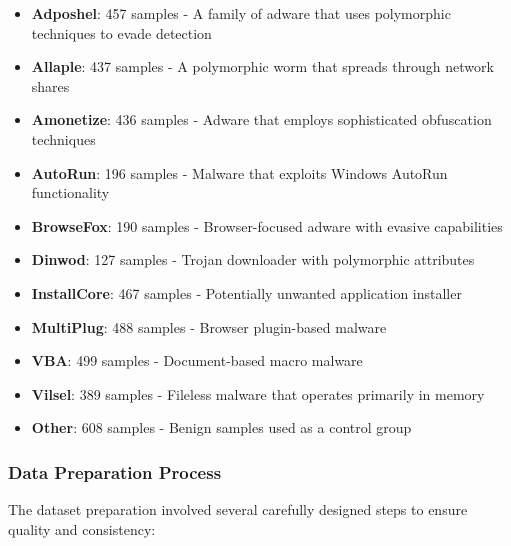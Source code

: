 \begin{itemize}
    \item \textbf{Adposhel}: 457 samples - A family of adware that uses polymorphic techniques to evade detection
    
    \item \textbf{Allaple}: 437 samples - A polymorphic worm that spreads through network shares
    
    \item \textbf{Amonetize}: 436 samples - Adware that employs sophisticated obfuscation techniques
    
    \item \textbf{AutoRun}: 196 samples - Malware that exploits Windows AutoRun functionality
    
    \item \textbf{BrowseFox}: 190 samples - Browser-focused adware with evasive capabilities
    
    \item \textbf{Dinwod}: 127 samples - Trojan downloader with polymorphic attributes
    
    \item \textbf{InstallCore}: 467 samples - Potentially unwanted application installer
    
    \item \textbf{MultiPlug}: 488 samples - Browser plugin-based malware
    
    \item \textbf{VBA}: 499 samples - Document-based macro malware
    
    \item \textbf{Vilsel}: 389 samples - Fileless malware that operates primarily in memory
    
    \item \textbf{Other}: 608 samples - Benign samples used as a control group
\end{itemize}

\subsubsection{Data Preparation Process}

The dataset preparation involved several carefully designed steps to ensure quality and consistency:

